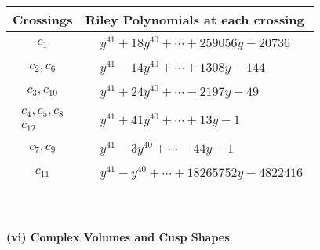 \documentclass[1p]{elsarticle_modified}
\theoremstyle{definition}
\begin{document}
\begin{tabular}{m{50pt}|m{274pt}}
Crossings & \hspace{64pt}Riley Polynomials at each crossing \\
\hline $$\begin{aligned}c_{1}\end{aligned}$$&$\begin{aligned}
&y^{41}+18 y^{40}+\cdots+259056 y-20736
\end{aligned}$\\
\hline $$\begin{aligned}c_{2},c_{6}\end{aligned}$$&$\begin{aligned}
&y^{41}-14 y^{40}+\cdots+1308 y-144
\end{aligned}$\\
\hline $$\begin{aligned}c_{3},c_{10}\end{aligned}$$&$\begin{aligned}
&y^{41}+24 y^{40}+\cdots-2197 y-49
\end{aligned}$\\
\hline $$\begin{aligned}c_{4},c_{5},c_{8}\\c_{12}\end{aligned}$$&$\begin{aligned}
&y^{41}+41 y^{40}+\cdots+13 y-1
\end{aligned}$\\
\hline $$\begin{aligned}c_{7},c_{9}\end{aligned}$$&$\begin{aligned}
&y^{41}-3 y^{40}+\cdots-44 y-1
\end{aligned}$\\
\hline $$\begin{aligned}c_{11}\end{aligned}$$&$\begin{aligned}
&y^{41}- y^{40}+\cdots+18265752 y-4822416
\end{aligned}$\\
\hline
\end{tabular}\\~\\
\newpage\flushleft \textbf{(vi) Complex Volumes and Cusp Shapes}
\end{document}
